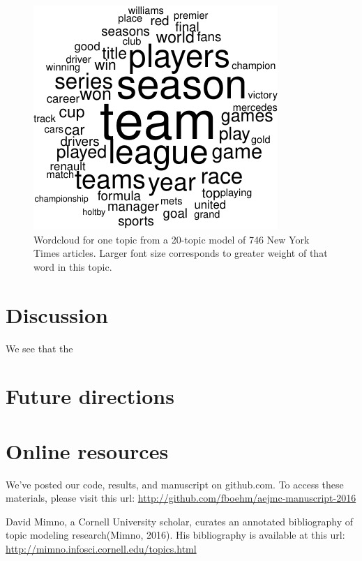 \documentclass[12pt,]{article}
\begin{document}
\begin{figure}
\includegraphics[width=\textwidth]{lda-tutorial-2016_files/figure-latex/wordcloud1-4.pdf}
\caption{Wordcloud for one topic from a 20-topic model of 746 New York Times articles. Larger font size corresponds to greater weight of that word in this topic.\label{fig:wc4}}
\end{figure}

\section{Discussion}\label{discussion}

We see that the

\section{Future directions}\label{future-directions}

\section{Online resources}\label{online-resources}

We've posted our code, results, and manuscript on github.com. To access
these materials, please visit this url:
\url{http://github.com/fboehm/aejmc-manuscript-2016}

David Mimno, a Cornell University scholar, curates an annotated
bibliography of topic modeling research(Mimno, 2016). His bibliography
is available at this url:
\url{http://mimno.infosci.cornell.edu/topics.html}
\end{document}
